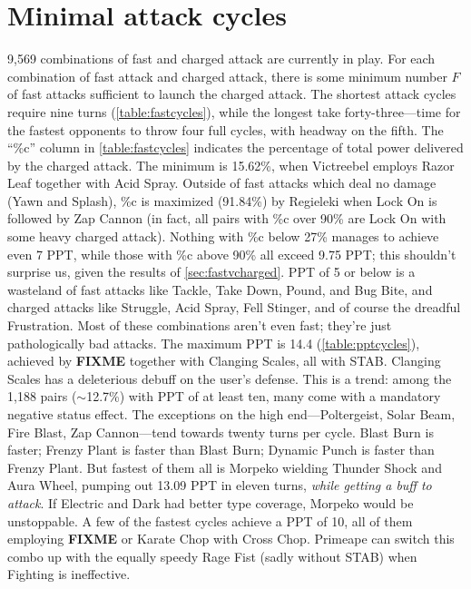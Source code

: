 \section{Minimal attack cycles\label{sec:minimalcycles}}
9,569 combinations of fast and charged attack are currently in play.
For each combination of fast attack and charged attack, there is some minimum number
 $F$ of fast attacks sufficient to launch the charged attack.
The shortest attack cycles require nine turns (\autoref{table:fastcycles}),
 while the longest take forty-three---time for the fastest opponents to
 throw four full cycles, with headway on the fifth.
The ``\%c'' column in \autoref{table:fastcycles} indicates the percentage of total
 power delivered by the charged attack.
The minimum is 15.62\%, when Victreebel employs Razor Leaf together with Acid Spray.
Outside of fast attacks which deal no damage (Yawn and Splash), \%c is maximized (91.84\%)
 by Regieleki when Lock On is followed by Zap Cannon
 (in fact, all pairs with \%c over 90\% are Lock On with some heavy charged attack).
Nothing with \%c below 27\% manages to achieve even 7 PPT, while
 those with \%c above 90\% all exceed 9.75 PPT; this shouldn't surprise
 us, given the results of \autoref{sec:fastvcharged}.
PPT of 5 or below is a wasteland of fast attacks like Tackle, Take Down, Pound, and Bug Bite,
 and charged attacks like Struggle, Acid Spray, Fell Stinger, and of course the dreadful Frustration.
Most of these combinations aren't even fast; they're just pathologically bad attacks.
The maximum PPT is 14.4 (\autoref{table:pptcycles}), achieved by \textbf{FIXME} together with Clanging Scales, all with STAB.
Clanging Scales has a deleterious debuff on the user's defense.
This is a trend: among the 1,188 pairs ($\sim$12.7\%) with PPT of at least ten,
 many come with a mandatory negative status effect.
The exceptions on the high end---Poltergeist, Solar Beam, Fire Blast, Zap Cannon---tend towards twenty turns per cycle.
Blast Burn is faster; Frenzy Plant is faster than Blast Burn; Dynamic Punch is faster than Frenzy Plant.
But fastest of them all is Morpeko wielding Thunder Shock and Aura Wheel, pumping out 13.09 PPT
 in eleven turns, \textit{while getting a buff to attack}.
If Electric and Dark had better type coverage, Morpeko would be unstoppable.
A few of the fastest cycles achieve a PPT of 10, all of them employing \textbf{FIXME} or Karate Chop with Cross Chop.
Primeape can switch this combo up with the equally speedy Rage Fist (sadly without STAB)
 when Fighting is ineffective.

